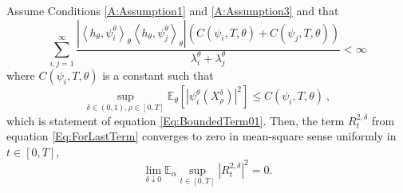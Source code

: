 \documentclass{article}
\begin{document}
\begin{lemma}
\label{L:R2convergence}
Assume Conditions \ref{A:Assumption1} and \ref{A:Assumption3} and that
\[
\sum_{i,j=1}^{\infty}\frac{\left|\left<h_{\theta},\psi_i^{\theta}\right>_{\theta} \left<h_{\theta},\psi_j^{\theta}\right>_{\theta}\right|\left(C(\psi_{i},T,\theta)+C(\psi_{j},T,\theta)\right)}{\lambda_i^{\theta}+\lambda_j^{\theta}}
 <\infty
\]
where $C(\psi_{i},T,\theta)$ is a constant such that \[
\sup_{\delta\in(0,1),\rho\in[0,T]}\mathbb E_\theta\left[|\psi_i^\theta(X_\rho^\delta)|^2\right]\leq C(\psi_{i},T,\theta)\ ,
\]
which is statement of equation \eqref{Eq:BoundedTerm01}. Then, the term $R^{2,\delta}_t$ from equation \eqref{Eq:ForLastTerm} converges to zero in mean-square sense uniformly in $t\in[0,T]$,
\[\lim_{\delta\downarrow 0}\mathbb{E}_{\alpha}\sup_{t\in[0,T]}\left|R^{2,\delta}_{t}\right|^{2}=0.\]
\end{lemma}
\end{document}
